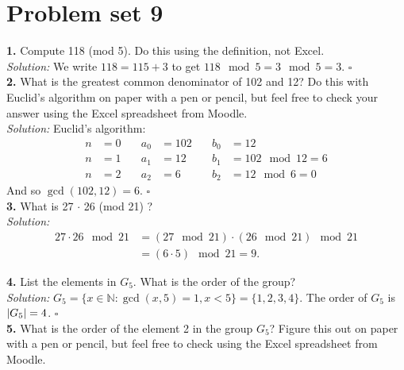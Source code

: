 \documentclass{book}
\theoremstyle{definition}
\newcommand{\nn}{\nonumber}
\begin{document}
\newpage




\section{Problem set 9}


\noindent \textbf{1.}  Compute 118 (mod 5). Do this using the definition, not Excel.\\

\noindent \textit{Solution:} We write $118 = 115+3$ to get $118 \mod 5 = 3\mod 5 = 3.$ \hfill $\square$\\





\noindent \textbf{2.} What is the greatest common denominator of 102 and 12? Do this with Euclid's algorithm on paper with a pen or pencil, but feel free to check your answer using the Excel spreadsheet from Moodle.\\


\noindent \textit{Solution:} Euclid's algorithm:
\begin{align}
n&=0 &\quad a_0 &= 102 &\quad b_0 &= 12\nn\\
n&=1 &\quad a_1 &= 12 &\quad b_1 &= 102\mod 12 = 6\nn\\
n&=2 &\quad a_2 &= 6 &\quad b_2 &= 12\mod 6 = 0
\end{align}
And so $\gcd(102,12) = 6$. \hfill $\square$\\




\noindent \textbf{3.} What is 27 $ \cdot $ 26 (mod 21) ?\\

\noindent \textit{Solution:} 
\begin{align}
27 \cdot 26 \mod 21 &= (27 \mod 21) \cdot (26 \mod 21) \mod 21 \nn\\
&= (6\cdot 5) \mod 21 = 9.
\end{align}


\noindent \textbf{4.} List the elements in $G_5$. What is the order of the group?\\

\noindent \textit{Solution:} $G_5 = \{ x\in \mathbb{N} : \gcd(x,5) = 1, x <  5 \} = \{ 1,2,3,4\}$. The order of $G_5$ is $\abs{G_5} = 4$. \hfill $\square$\\




\noindent \textbf{5.} What is the order of the element 2 in the group $G_5$? Figure this out on paper with a pen or
pencil, but feel free to check using the Excel spreadsheet from Moodle.\\
\end{document}
